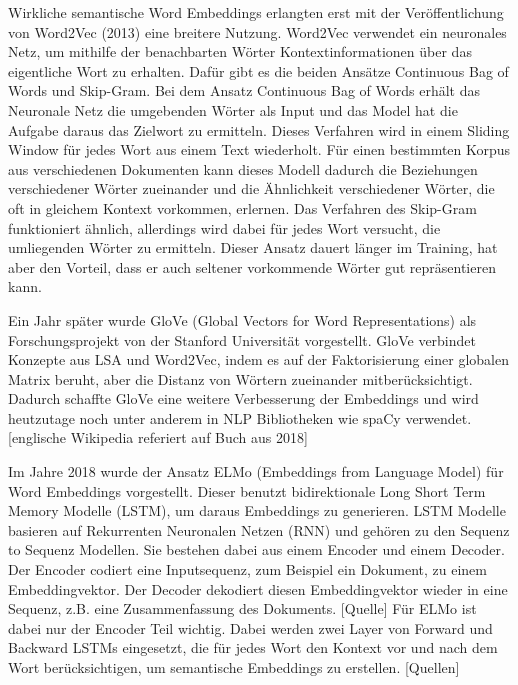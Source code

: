 Wirkliche semantische Word Embeddings erlangten erst mit der Veröffentlichung von Word2Vec (2013) eine breitere Nutzung. 
Word2Vec verwendet ein neuronales Netz, um mithilfe der benachbarten Wörter Kontextinformationen über das eigentliche Wort zu erhalten. 
Dafür gibt es die beiden Ansätze Continuous Bag of Words und Skip-Gram.
Bei dem Ansatz Continuous Bag of Words erhält das Neuronale Netz die umgebenden Wörter als Input und das Model hat die Aufgabe daraus das Zielwort zu ermitteln. 
Dieses Verfahren wird in einem Sliding Window für jedes Wort aus einem Text wiederholt. 
Für einen bestimmten Korpus aus verschiedenen Dokumenten kann dieses Modell dadurch die Beziehungen verschiedener Wörter zueinander und die Ähnlichkeit verschiedener Wörter, die oft in gleichem Kontext vorkommen, erlernen. 
Das Verfahren des Skip-Gram funktioniert ähnlich, allerdings wird dabei für jedes Wort versucht, die umliegenden Wörter zu ermitteln. 
Dieser Ansatz dauert länger im Training, hat aber den Vorteil, dass er auch seltener vorkommende Wörter gut repräsentieren kann.

Ein Jahr später wurde GloVe (Global Vectors for Word Representations) als Forschungsprojekt von der Stanford Universität vorgestellt.
GloVe verbindet Konzepte aus LSA und Word2Vec, indem es auf der Faktorisierung einer globalen Matrix beruht, aber die Distanz von Wörtern zueinander mitberücksichtigt.
Dadurch schaffte GloVe eine weitere Verbesserung der Embeddings und wird heutzutage noch unter anderem in NLP Bibliotheken wie spaCy verwendet.[englische Wikipedia referiert auf Buch aus 2018]

Im Jahre 2018 wurde der Ansatz ELMo (Embeddings from Language Model) für Word Embeddings vorgestellt.
Dieser benutzt bidirektionale Long Short Term Memory Modelle (LSTM), um daraus Embeddings zu generieren.
LSTM Modelle basieren auf Rekurrenten Neuronalen Netzen (RNN) und gehören zu den Sequenz to Sequenz Modellen. 
Sie bestehen dabei aus einem Encoder und einem Decoder.
Der Encoder codiert eine Inputsequenz, zum Beispiel ein Dokument, zu einem Embeddingvektor. 
Der Decoder dekodiert diesen Embeddingvektor wieder in eine Sequenz, z.B. eine Zusammenfassung des Dokuments. [Quelle]
Für ELMo ist dabei nur der Encoder Teil wichtig.
Dabei werden zwei Layer von Forward und Backward LSTMs eingesetzt, die für jedes Wort den Kontext vor und nach dem Wort berücksichtigen, um semantische Embeddings zu erstellen. [Quellen]

